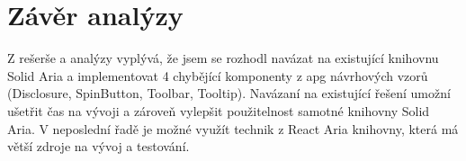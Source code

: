 
\section{Závěr analýzy}

Z rešerše a analýzy vyplývá, že jsem se rozhodl navázat na existující knihovnu Solid Aria a implementovat 4 chybějící komponenty z \gls{apg} návrhových vzorů (Disclosure, SpinButton, Toolbar, Tooltip).
Navázaní na existující řešení umožní ušetřit čas na vývoji a zároveň vylepšit použitelnost samotné knihovny Solid Aria.
V neposlední řadě je možné využít technik z React Aria knihovny, která má větší zdroje na vývoj a testování.
